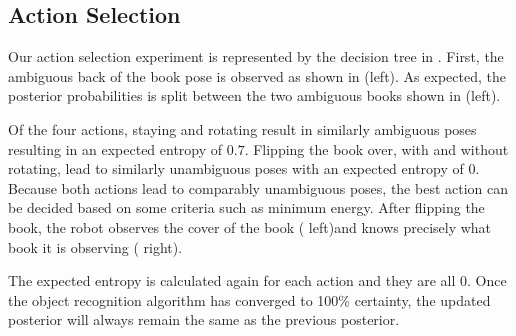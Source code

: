     \subsection{Action Selection}
	Our action selection experiment is represented by the decision tree in .    
	First, the ambiguous back of the book pose is observed as shown in  (left). As expected, the posterior probabilities is split between the two ambiguous books shown in  (left).    

 Of the four actions, staying and rotating result in similarly ambiguous poses resulting in an expected entropy of $0.7$. Flipping the book over, with and without rotating, lead to similarly unambiguous poses with an expected entropy of $0$. Because both actions lead to comparably unambiguous poses, the best action can be decided based on some criteria such as minimum energy. After flipping the book, the robot observes the cover of the book ( left)and knows precisely what book it is observing ( right).

        The expected entropy is calculated again for each action and they are all $0$. Once the object recognition algorithm has converged to 100\% certainty, the updated posterior will always remain the same as the previous posterior.
    
    

        
